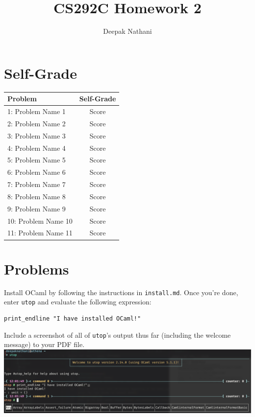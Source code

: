 \documentclass{jhwhw}
\author{Deepak Nathani}
\title{CS292C Homework 2}
\begin{document}
\maketitle

\section{Self-Grade}

\begin{table}[h]
    \centering
    \begin{tabular}{l|c}
        \toprule
        \midrule
        \textbf{Problem} & \textbf{Self-Grade} \\
        \midrule
        {1: Problem Name 1} & {Score} \\
        \midrule
        {2: Problem Name 2} & {Score} \\
        \midrule
        {3: Problem Name 3} & {Score} \\
        \midrule
        {4: Problem Name 4} & {Score} \\
        \midrule
        {5: Problem Name 5} & {Score} \\
        \midrule
        {6: Problem Name 6} & {Score} \\
        \midrule
        {7: Problem Name 7} & {Score} \\
        \midrule
        {8: Problem Name 8} & {Score} \\
        \midrule
        {9: Problem Name 9} & {Score} \\
        \midrule
        {10: Problem Name 10} & {Score} \\
        \midrule
        {11: Problem Name 11} & {Score} \\
        \midrule
        \bottomrule
    \end{tabular}
\end{table}

\section{Problems}
Install OCaml by following the instructions in \texttt{install.md}.
Once you're done, enter \texttt{utop} and evaluate the following expression:
\begin{lstlisting}
print_endline "I have installed OCaml!"
\end{lstlisting}
Include a screenshot of all of \texttt{utop}'s output thus far (including the welcome message) to your PDF file.
\newline
\solution
\includegraphics[width=\textwidth]{problem1.png}

\solution
\problem{}
\solution
\problem{}
\solution
\problem{}
\solution
\problem{}
\solution
\problem{}
\solution
\problem{}
\solution
\problem{}
\solution
\problem{}
\solution
\end{document}
